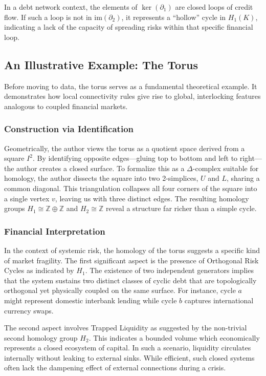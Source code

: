 \documentclass[12pt,reqno]{amsart}
\theoremstyle{definition}
\numberwithin{equation}{section}
\begin{document}
    In a debt network context, the elements of $\ker(\partial_1)$ are closed loops of credit flow. If such a loop is not in $\text{im}(\partial_2)$, it represents a ``hollow'' cycle in $H_1(K)$, indicating a lack of the capacity of spreading risks within that specific financial loop.

   \subsection{An Illustrative Example: The Torus} 
   Before moving to data, the torus serves as a fundamental theoretical example. It demonstrates how local connectivity rules give rise to global, interlocking features analogous to coupled financial markets.
   
   \subsubsection{Construction via Identification}
   Geometrically, the author views the torus as a quotient space derived from a square $I^2$. By identifying opposite edges—gluing top to bottom and left to right—the author creates a closed surface. To formalize this as a $\Delta$-complex suitable for homology, the author dissects the square into two 2-simplices, $U$ and $L$, sharing a common diagonal. This triangulation collapses all four corners of the square into a single vertex $v$, leaving us with three distinct edges. The resulting homology groups $H_1 \cong \mathbb{Z} \oplus \mathbb{Z}$ and $H_2 \cong \mathbb{Z}$ reveal a structure far richer than a simple cycle.

   \subsubsection{Financial Interpretation}
   In the context of systemic risk, the homology of the torus suggests a specific kind of market fragility. The first significant aspect is the presence of Orthogonal Risk Cycles as indicated by $H_1$. The existence of two independent generators implies that the system sustains two distinct classes of cyclic debt that are topologically orthogonal yet physically coupled on the same surface. For instance, cycle $a$ might represent domestic interbank lending while cycle $b$ captures international currency swaps.
   
   The second aspect involves Trapped Liquidity as suggested by the non-trivial second homology group $H_2$. This indicates a bounded volume which economically represents a closed ecosystem of capital. In such a scenario, liquidity circulates internally without leaking to external sinks. While efficient, such closed systems often lack the dampening effect of external connections during a crisis.
\end{document}
